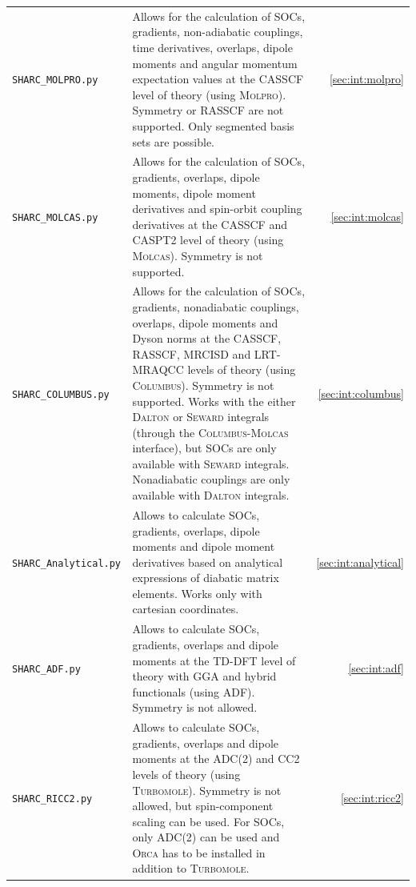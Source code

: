 \documentclass[a4paper,11pt,DIV=15,openany,twoside=false]{scrbook}
\begin{document}
\begin{tabular}{>{\tt}lp{9.5cm}r}
  SHARC\_MOLPRO.py      &Allows for the calculation of SOCs, gradients, non-adiabatic couplings, time derivatives, overlaps, dipole moments and angular momentum expectation values at the CASSCF level of theory (using \textsc{Molpro}). Symmetry or RASSCF are not supported. Only segmented basis sets are possible.   &\ref{sec:int:molpro}\\
  SHARC\_MOLCAS.py      &Allows for the calculation of SOCs, gradients, overlaps, dipole moments, dipole moment derivatives and spin-orbit coupling derivatives at the CASSCF and CASPT2 level of theory (using \textsc{Molcas}). Symmetry is not supported.   &\ref{sec:int:molcas}\\
  SHARC\_COLUMBUS.py    &Allows for the calculation of SOCs, gradients, nonadiabatic couplings, overlaps, dipole moments and Dyson norms at the CASSCF, RASSCF, MRCISD and LRT-MRAQCC levels of theory (using \textsc{Columbus}). Symmetry is not supported. Works with the either \textsc{Dalton} or \textsc{Seward} integrals (through the \textsc{Columbus}-\textsc{Molcas} interface), but SOCs are only available with \textsc{Seward} integrals. Nonadiabatic couplings are only available with \textsc{Dalton} integrals.                &\ref{sec:int:columbus}\\
  SHARC\_Analytical.py  &Allows to calculate SOCs, gradients, overlaps, dipole moments and dipole moment derivatives based on analytical expressions of diabatic matrix elements. Works only with cartesian coordinates.       &\ref{sec:int:analytical}\\
  SHARC\_ADF.py         &Allows to calculate SOCs, gradients, overlaps and dipole moments at the TD-DFT level of theory with GGA and hybrid functionals (using \textsc{ADF}). Symmetry is not allowed.  &\ref{sec:int:adf}\\
  SHARC\_RICC2.py       &Allows to calculate SOCs, gradients, overlaps and dipole moments at the ADC(2) and CC2 levels of theory (using \textsc{Turbomole}). Symmetry is not allowed, but spin-component scaling can be used. For SOCs, only ADC(2) can be used and \textsc{Orca} has to be installed in addition to \textsc{Turbomole}.        &\ref{sec:int:ricc2}\\
\end{tabular}



\end{document}
